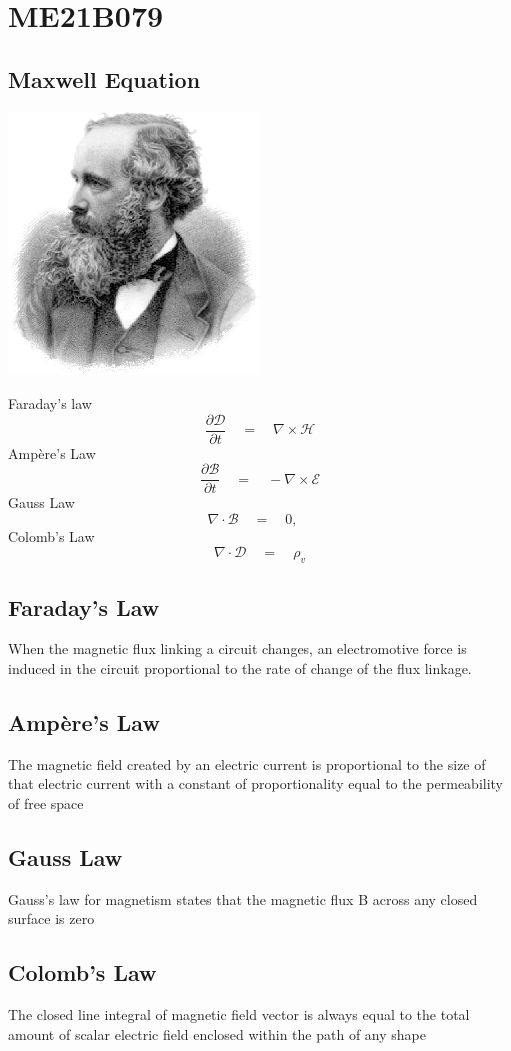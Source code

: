 \section{ME21B079}
\subsection{Maxwell Equation}
\begin{center}
\includegraphics[width=0.5\textwidth]{./ME21B079/max.eps}
\end{center}
Faraday's law
$$ \frac{\partial\mathcal{D}}{\partial t} \quad  = \quad \nabla\times\mathcal{H}$$
Ampère's Law
$$ \frac{\partial\mathcal{B}}{\partial t} \quad  = \quad -\nabla\times\mathcal{E}$$
Gauss Law
$$ \nabla\cdot\mathcal{B}\quad  = \quad 0, \quad$$
Colomb's Law
$$ \nabla\cdot\mathcal{D}\quad  = \quad \rho_{v} $$
\subsection{Faraday's Law}
When the magnetic flux linking a circuit changes, an electromotive force is induced in the circuit proportional to the rate of change of the flux linkage.
\subsection{Ampère's Law}
The magnetic field created by an electric current is proportional to the size of that electric current with a constant of proportionality equal to the permeability of free space
\subsection{Gauss Law}
Gauss's law for magnetism states that the magnetic flux B across any closed surface is zero
\subsection{Colomb's Law}
The closed line integral of magnetic field vector is always equal to the total amount of scalar electric field enclosed within the path of any shape
